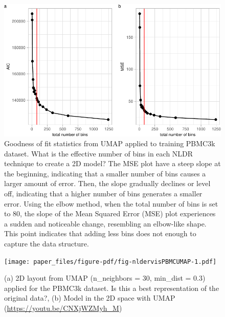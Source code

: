 \documentclass[
  12pt]{article}
\begin{document}
\begin{figure}

{\centering \includegraphics{paper_files/figure-pdf/fig-diagnosticpltPBMC-1.pdf}

}

\caption{\label{fig-diagnosticpltPBMC}Goodness of fit statistics from
UMAP applied to training PBMC3k dataset. What is the effective number of
bins in each NLDR technique to create a 2D model? The MSE plot have a
steep slope at the beginning, indicating that a smaller number of bins
causes a larger amount of error. Then, the slope gradually declines or
level off, indicating that a higher number of bins generates a smaller
error. Using the elbow method, when the total number of bins is set to
80, the slope of the Mean Squared Error (MSE) plot experiences a sudden
and noticeable change, resembling an elbow-like shape. This point
indicates that adding less bins does not enough to capture the data
structure.}

\end{figure}

\begin{figure}[h]

{\centering \texttt{[image: paper\_files/figure-pdf/fig-nldervisPBMCUMAP-1.pdf]}

}

\caption{\label{fig-nldervisPBMCUMAP}(a) 2D layout from UMAP
(n\_neighbors = 30, min\_dist = 0.3) applied for the PBMC3k dataset. Is
this a best representation of the original data?, (b) Model in the 2D
space with UMAP (\url{https://youtu.be/CNXjWZMyh_M})}

\end{figure}
\end{document}
